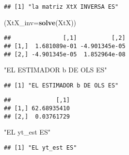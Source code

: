\documentclass[
]{article}
\newenvironment{Shaded}{\begin{snugshade}}{\end{snugshade}}
\newcommand{\DataTypeTok}[1]{\textcolor[rgb]{0.13,0.29,0.53}{#1}}
\newcommand{\KeywordTok}[1]{\textcolor[rgb]{0.13,0.29,0.53}{\textbf{#1}}}
\newcommand{\NormalTok}[1]{#1}
\newcommand{\OperatorTok}[1]{\textcolor[rgb]{0.81,0.36,0.00}{\textbf{#1}}}
\newcommand{\StringTok}[1]{\textcolor[rgb]{0.31,0.60,0.02}{#1}}
\begin{document}
\begin{verbatim}
## [1] "la matriz XtX INVERSA ES"
\end{verbatim}

\begin{Shaded}
\begin{Highlighting}[]
\NormalTok{(}\DataTypeTok{XtX_inv=}\KeywordTok{solve}\NormalTok{(XtX))}
\end{Highlighting}
\end{Shaded}

\begin{verbatim}
##               [,1]          [,2]
## [1,]  1.681089e-01 -4.901345e-05
## [2,] -4.901345e-05  1.852964e-08
\end{verbatim}

\begin{Shaded}
\begin{Highlighting}[]
\StringTok{"EL ESTIMADOR b DE OLS ES"}
\end{Highlighting}
\end{Shaded}

\begin{verbatim}
## [1] "EL ESTIMADOR b DE OLS ES"
\end{verbatim}

\begin{Shaded}
\end{Shaded}

\begin{verbatim}
##             [,1]
## [1,] 62.68935410
## [2,]  0.03761729
\end{verbatim}

\begin{Shaded}
\begin{Highlighting}[]
\StringTok{"EL yt_est ES"}
\end{Highlighting}
\end{Shaded}

\begin{verbatim}
## [1] "EL yt_est ES"
\end{verbatim}

\begin{Shaded}
\end{Shaded}
\end{document}
